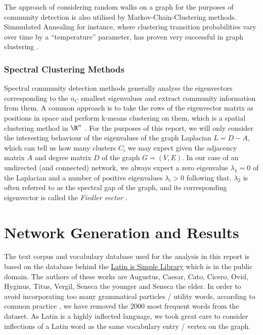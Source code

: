 \documentclass[12pt, a4paper]{article}
\begin{document}
  The approach of considering random walks on a graph for the purposes of community detection is also utilised by Markov-Chain-Clustering methods.
  Simmulated Annealing for instance, where clustering transition probabilities vary over time by a ``temperature'' parameter, has proven very successful in graph clustering \parencite{fortunato}.

  \subsubsection{Spectral Clustering Methods}
  \label{sec:spectral-clustering}
  Spectral community detection methods generally analyse the eigenvectors corresponding to the $n_C$ smallest eigenvalues and extract community information from them. A common approach is to take the rows of the eigenvector matrix as positions in space and perform k-means clustering on them, which is a spatial clustering method in $\R^n$ \parencite{fortunato}.
  For the purposes of this report, we will only consider the interesting behaviour of the eigenvalues of the graph Laplacian $L = D - A$, which can tell us how many clusters $C_i$ we may expect given the adjacency matrix $A$ and degree matrix $D$ of the graph $G = (V, E)$.
  In our case of an undirected (and connected) network, we always expect a zero eigenvalue $\lambda_1 = 0$ of the Laplacian and a number of positive eigenvalues $\lambda_i > 0$ following that. $\lambda_2$ is often referred to as the spectral gap of the graph, and its corresponding eigenvector is called the \textit{Fiedler vector} \parencite{grindrod-lecture-notes}.

  \pagebreak
  \section{Network Generation and Results}
  The text corpus and vocabulary database used for the analysis in this report is based on the database behind the \href{https://www.latin-is-simple.com/en/library/}{Latin is Simple Library} which is in the public domain. The authors of these works are Augustus, Caesar, Cato, Cicero, Ovid, Hyginus, Titus, Vergil, Seneca the younger and Seneca the elder.
  In order to avoid incorporating too many grammatical particles / utility words, according to common practice \parencite{cw-biemann}, we have removed the 2000 most frequent words from the dataset.
  As Latin is a highly inflected language, we took great care to consider inflections of a Latin word as the same vocabulary entry / vertex on the graph.
\end{document}
